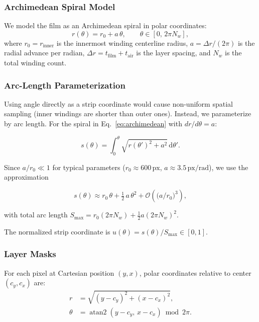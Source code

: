 \documentclass[11pt,a4paper]{article}
\begin{document}
\subsubsection{Archimedean Spiral Model}

We model the film as an Archimedean spiral in polar coordinates:
\begin{equation}
    r(\theta) = r_0 + a\,\theta, \qquad \theta \in [0,\, 2\pi N_w],
    \label{eq:archimedean}
\end{equation}
where $r_0 = r_{\text{inner}}$ is the innermost winding centerline radius, $a = \Delta r / (2\pi)$ is the radial advance per radian, $\Delta r = t_{\text{film}} + t_{\text{air}}$ is the layer spacing, and $N_w$ is the total winding count.

\subsubsection{Arc-Length Parameterization}

Using angle directly as a strip coordinate would cause non-uniform spatial sampling (inner windings are shorter than outer ones). Instead, we parameterize by arc length. For the spiral in Eq.~\eqref{eq:archimedean} with $dr/d\theta = a$:

\begin{equation}
    s(\theta) = \int_0^\theta \sqrt{r(\theta')^2 + a^2}\,\mathrm{d}\theta'.
\end{equation}

Since $a/r_0 \ll 1$ for typical parameters ($r_0 \approx 600\,\text{px}$, $a \approx 3.5\,\text{px/rad}$), we use the approximation

\begin{equation}
    s(\theta) \approx r_0\,\theta + \tfrac{1}{2}\,a\,\theta^2 + \mathcal{O}\!\left(\bigl(a/r_0\bigr)^3\right),
    \label{eq:arc_approx}
\end{equation}

with total arc length $S_{\max} = r_0(2\pi N_w) + \frac{1}{2}a(2\pi N_w)^2$.

The normalized strip coordinate is $u(\theta) = s(\theta)/S_{\max} \in [0,1]$.

\subsubsection{Layer Masks}

For each pixel at Cartesian position $(y, x)$, polar coordinates relative to center $(c_y, c_x)$ are:
\begin{align}
    r &= \sqrt{(y-c_y)^2 + (x-c_x)^2}, \\
    \theta &= \operatorname{atan2}(y - c_y,\, x - c_x) \bmod 2\pi.
\end{align}
\end{document}
